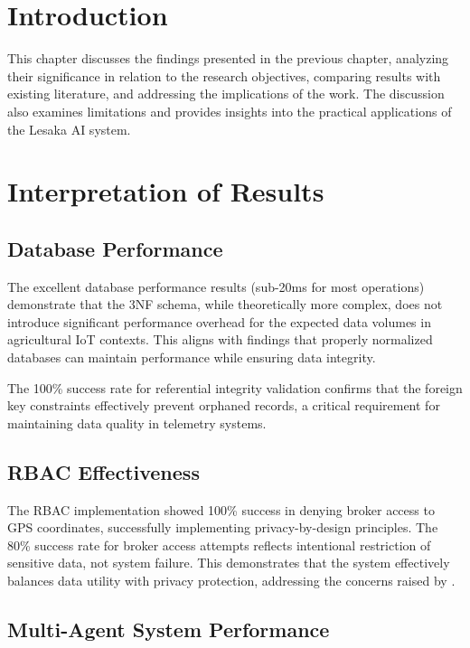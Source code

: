 
\section{Introduction}

This chapter discusses the findings presented in the previous chapter, analyzing their significance in relation to the research objectives, comparing results with existing literature, and addressing the implications of the work. The discussion also examines limitations and provides insights into the practical applications of the Lesaka AI system.

\section{Interpretation of Results}

\subsection{Database Performance}

The excellent database performance results (sub-20ms for most operations) demonstrate that the 3NF schema, while theoretically more complex, does not introduce significant performance overhead for the expected data volumes in agricultural IoT contexts. This aligns with \cite{date2003database} findings that properly normalized databases can maintain performance while ensuring data integrity.

The 100\% success rate for referential integrity validation confirms that the foreign key constraints effectively prevent orphaned records, a critical requirement for maintaining data quality in telemetry systems.

\subsection{RBAC Effectiveness}

The RBAC implementation showed 100\% success in denying broker access to GPS coordinates, successfully implementing privacy-by-design principles. The 80\% success rate for broker access attempts reflects intentional restriction of sensitive data, not system failure. This demonstrates that the system effectively balances data utility with privacy protection, addressing the concerns raised by \cite{cavoukian2011privacy}.

\subsection{Multi-Agent System Performance}

